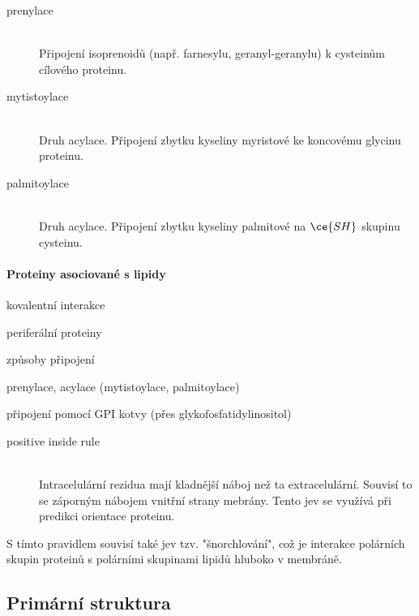 \documentclass[DIV=8]{scrreprt}
\begin{document}
\begin{description}
\item[prenylace]\hfill \\
Připojení isoprenoidů (např. farnesylu, geranyl-geranylu) k cysteinům cílového proteinu.


\item[mytistoylace]\hfill \\
Druh acylace. Připojení zbytku kyseliny myristové ke koncovému glycinu proteinu.


\item[palmitoylace]\hfill \\
Druh acylace. Připojení zbytku kyseliny palmitové na \(\ce{SH}\) skupinu cysteinu.

\end{description}


\paragraph{Proteiny asociované s lipidy}
\begin{myItemize}[nosep]
    \item kovalentní interakce
    \item periferální proteiny
    \item způsoby připojení
\begin{myItemize}[nosep]
    \item prenylace, acylace (mytistoylace, palmitoylace)
    \item připojení pomocí GPI kotvy (přes glykofosfatidylinositol)
\end{myItemize}

\end{myItemize}



\begin{description}
\item[positive inside rule]\hfill \\
Intracelulární rezidua mají kladnější náboj než ta extracelulární. Souvisí to se záporným nábojem vnitřní strany mebrány. Tento jev se využívá při predikci orientace proteinu.

\end{description}


S tímto pravidlem souvisí také jev tzv. "šnorchlování", což je interakce polárních skupin proteinů s polárními skupinami lipidů hluboko v membráně.

\subsection{Primární struktura} \label{Primární struktura}
\end{document}

